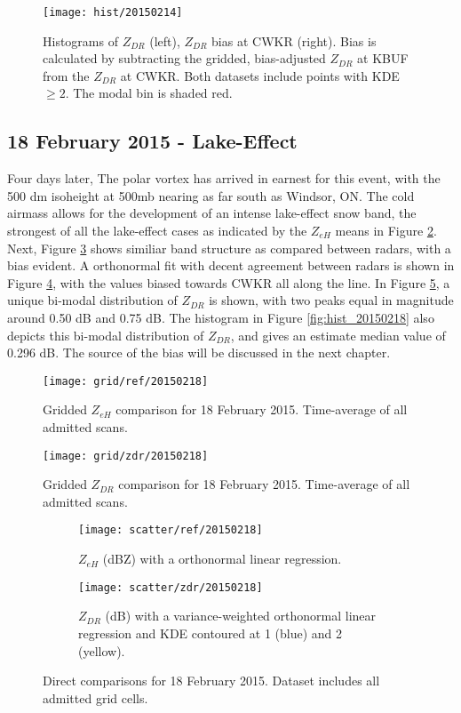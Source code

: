 \begin{figure}[p]
\texttt{[image: hist/20150214]}\centering
\caption{Histograms of $Z_{DR}$ (left), $Z_{DR}$ bias at CWKR (right). Bias is calculated by subtracting the gridded, bias-adjusted $Z_{DR}$ at KBUF from the
$Z_{DR}$ at CWKR. Both datasets include points with KDE $\geq 2$. The modal bin is shaded red.} 
\label{fig:hist_20150214}
\end{figure}

\subsection{18 February 2015 - Lake-Effect}
Four days later, The polar vortex has arrived in earnest for this event, with the 500 dm isoheight at 500mb nearing as far south as Windsor, ON. The cold airmass allows for the development of an intense lake-effect snow band, the strongest of all the lake-effect cases as indicated by the $Z_{eH}$ means in Figure \ref{fig:grid_ref_20150218}. Next, Figure \ref{fig:grid_zdr_20150218} shows similiar band structure as compared between radars, with a bias evident. A orthonormal fit with decent agreement between radars is shown in Figure \ref{fig:scatter_ref_20150218}, with the values biased towards CWKR all along the line. In Figure \ref{fig:scatter_zdr_20150218}, a unique bi-modal distribution of $Z_{DR}$ is shown, with two peaks equal in magnitude around 0.50 dB and 0.75 dB. The histogram in Figure \ref{fig:hist_20150218} also depicts this bi-modal distribution of $Z_{DR}$, and gives an estimate median value of 0.296 dB. The source of the bias will be discussed in the next chapter. 
\begin{figure}[H]
\texttt{[image: grid/ref/20150218]}
\caption{Gridded $Z_{eH}$ comparison for 18 February 2015. Time-average of all admitted scans.} 
\label{fig:grid_ref_20150218}
\end{figure}

\begin{figure}[p]
\texttt{[image: grid/zdr/20150218]}
\caption{Gridded $Z_{DR}$ comparison for 18 February 2015. Time-average of all admitted scans.} 
\label{fig:grid_zdr_20150218}
\end{figure}

\begin{figure}[p]
\centering
   \begin{subfigure}[t]{0.48\linewidth} \centering
     \texttt{[image: scatter/ref/20150218]}
     \caption{$Z_{eH}$ (dBZ) with a orthonormal linear regression.}\label{fig:scatter_ref_20150218}
   \end{subfigure}
   \begin{subfigure}[t]{0.48\linewidth} \centering
     \texttt{[image: scatter/zdr/20150218]}
     \caption{$Z_{DR}$ (dB) with a variance-weighted orthonormal linear regression and KDE contoured at 1 (blue) and 2 (yellow).}\label{fig:scatter_zdr_20150218}
   \end{subfigure}
\caption{Direct comparisons for 18 February 2015. Dataset includes all admitted grid cells.} \label{fig:scatter_20150218}
\end{figure}

